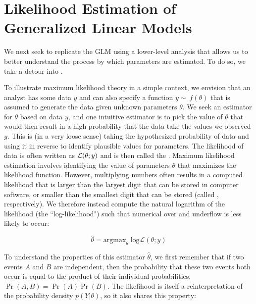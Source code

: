 \section{Likelihood Estimation of Generalized Linear Models} \label{sec:Chap1_likelihood_GLM}

We next seek to replicate the GLM using a lower-level analysis that allows us to better understand the process by which parameters are estimated.  To do so, we take a detour into  \cite{fisher_mathematical_1922}.  

To illustrate maximum likelihood theory in a simple context, we envision that an analyst has some data \( y \) and can also specify a function \( y \sim\ f( \theta ) \) that is assumed to generate the data given unknown parameters \(\theta\).  We seek an estimator for \( \theta \) based on data \(y\), and one intuitive estimator is to pick the value of \( \theta \) that would then result in a high probability that the data take the values we observed \(y\).  This  is (in a very loose sense) taking the hypothesized probability of data and using it in reverse to identify plausible values for parameters. The likelihood of data is often written as \( \operatorname{\mathcal{L}}( \theta; y ) \) and is then called the . Maximum likelihood estimation involves identifying the value of parameters \( \theta \) that maximizes the likelihood function.  However, multiplying numbers often results in a computed likelihood that is larger than the largest digit that can be stored in computer software, or smaller than the smallest digit that can be stored (called , respectively).  We therefore instead compute the natural logarithm of the likelihood (the ``log-likelihood") such that numerical over and underflow is less likely to occur:  

\begin{equation}
    \hat{\theta} = \mathrm{argmax}_{\theta} \; \mathrm{log} \mathcal{L}( \theta; y )
\end{equation}

To understand the properties of this estimator \( \hat{\theta} \), we first remember that if two events \(A\) and \(B\) are independent, then the probability that these two events both occur is equal to the product of their individual probabilities, \( \Pr(A, B) = \Pr(A) \Pr(B) \).  The likelihood is itself a reinterpretation of the probability density \( p(Y \vert \theta) \), so it also shares this property:

